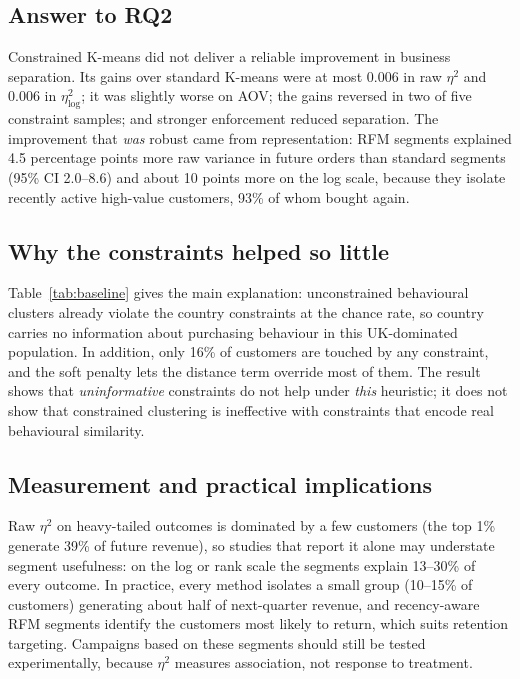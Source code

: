 \documentclass[conference,10pt]{IEEEtran}
\newcommand{\etasq}{\eta^{2}}
\begin{document}
\subsection{Answer to RQ2}
Constrained K-means did not deliver a reliable improvement in business
separation. Its gains over standard K-means were at most 0.006 in raw
$\etasq$ and 0.006 in $\etasq_{\log}$; it was slightly worse on AOV; the gains
reversed in two of five constraint samples; and stronger enforcement reduced
separation. The improvement that \emph{was} robust came from representation:
RFM segments explained 4.5 percentage points more raw variance in future
orders than standard segments (95\% CI 2.0--8.6) and about 10 points more on
the log scale, because they isolate recently active high-value customers,
93\% of whom bought again.

\subsection{Why the constraints helped so little}
Table~\ref{tab:baseline} gives the main explanation: unconstrained
behavioural clusters already violate the country constraints at the chance
rate, so country carries no information about purchasing behaviour in this
UK-dominated population. In addition, only 16\% of customers are touched by
any constraint, and the soft penalty lets the distance term override most of
them. The result shows that \emph{uninformative} constraints do not help
under \emph{this} heuristic; it does not show that constrained clustering is
ineffective with constraints that encode real behavioural similarity.

\subsection{Measurement and practical implications}
Raw $\etasq$ on heavy-tailed outcomes is dominated by a few customers (the
top 1\% generate 39\% of future revenue), so studies that report it alone may
understate segment usefulness: on the log or rank scale the segments explain
13--30\% of every outcome. In practice, every method isolates a small group
(10--15\% of customers) generating about half of next-quarter revenue, and
recency-aware RFM segments identify the customers most likely to return,
which suits retention targeting. Campaigns based on these segments should
still be tested experimentally, because $\etasq$ measures association, not
response to treatment.
\end{document}
